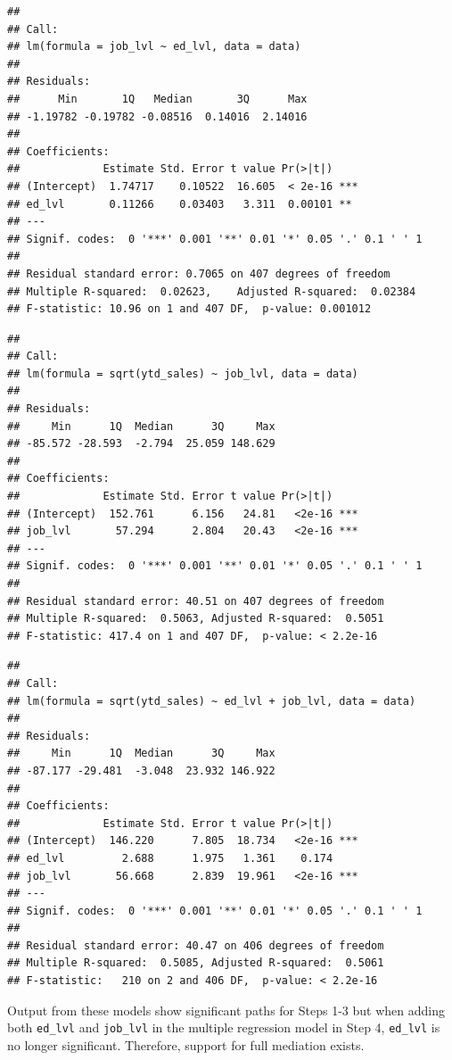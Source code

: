 \documentclass[
]{book}
\begin{document}
\begin{verbatim}
## 
## Call:
## lm(formula = job_lvl ~ ed_lvl, data = data)
## 
## Residuals:
##      Min       1Q   Median       3Q      Max 
## -1.19782 -0.19782 -0.08516  0.14016  2.14016 
## 
## Coefficients:
##             Estimate Std. Error t value Pr(>|t|)    
## (Intercept)  1.74717    0.10522  16.605  < 2e-16 ***
## ed_lvl       0.11266    0.03403   3.311  0.00101 ** 
## ---
## Signif. codes:  0 '***' 0.001 '**' 0.01 '*' 0.05 '.' 0.1 ' ' 1
## 
## Residual standard error: 0.7065 on 407 degrees of freedom
## Multiple R-squared:  0.02623,    Adjusted R-squared:  0.02384 
## F-statistic: 10.96 on 1 and 407 DF,  p-value: 0.001012
\end{verbatim}

\begin{verbatim}
## 
## Call:
## lm(formula = sqrt(ytd_sales) ~ job_lvl, data = data)
## 
## Residuals:
##     Min      1Q  Median      3Q     Max 
## -85.572 -28.593  -2.794  25.059 148.629 
## 
## Coefficients:
##             Estimate Std. Error t value Pr(>|t|)    
## (Intercept)  152.761      6.156   24.81   <2e-16 ***
## job_lvl       57.294      2.804   20.43   <2e-16 ***
## ---
## Signif. codes:  0 '***' 0.001 '**' 0.01 '*' 0.05 '.' 0.1 ' ' 1
## 
## Residual standard error: 40.51 on 407 degrees of freedom
## Multiple R-squared:  0.5063, Adjusted R-squared:  0.5051 
## F-statistic: 417.4 on 1 and 407 DF,  p-value: < 2.2e-16
\end{verbatim}

\begin{verbatim}
## 
## Call:
## lm(formula = sqrt(ytd_sales) ~ ed_lvl + job_lvl, data = data)
## 
## Residuals:
##     Min      1Q  Median      3Q     Max 
## -87.177 -29.481  -3.048  23.932 146.922 
## 
## Coefficients:
##             Estimate Std. Error t value Pr(>|t|)    
## (Intercept)  146.220      7.805  18.734   <2e-16 ***
## ed_lvl         2.688      1.975   1.361    0.174    
## job_lvl       56.668      2.839  19.961   <2e-16 ***
## ---
## Signif. codes:  0 '***' 0.001 '**' 0.01 '*' 0.05 '.' 0.1 ' ' 1
## 
## Residual standard error: 40.47 on 406 degrees of freedom
## Multiple R-squared:  0.5085, Adjusted R-squared:  0.5061 
## F-statistic:   210 on 2 and 406 DF,  p-value: < 2.2e-16
\end{verbatim}

Output from these models show significant paths for Steps 1-3 but when adding both \texttt{ed\_lvl} and \texttt{job\_lvl} in the multiple regression model in Step 4, \texttt{ed\_lvl} is no longer significant. Therefore, support for full mediation exists.
\end{document}
